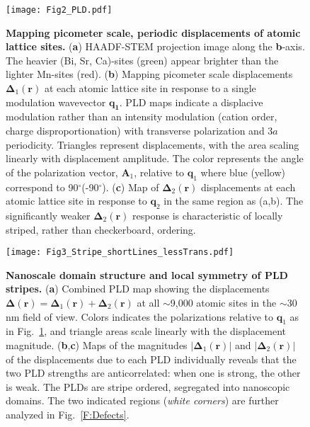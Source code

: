 \documentclass[12pt]{article}
\begin{document}
\begin{figure}
  \texttt{[image: Fig2\_PLD.pdf]}
  \caption{\textbf{Mapping picometer scale, periodic displacements of atomic lattice sites.} 
(\textbf{a}) HAADF-STEM projection image along the \textbf{b}-axis.  
The heavier (Bi, Sr, Ca)-sites (green) appear brighter than the lighter Mn-sites (red).
(\textbf{b}) Mapping picometer scale displacements $\mathbf{\Delta}_1(\mathbf{r})$ at each atomic lattice site in response to a single modulation wavevector $\mathbf{q_{1}}$. 
PLD maps indicate a displacive modulation rather than an intensity modulation (cation order, charge disproportionation) with transverse polarization and 3$a$ periodicity. 
Triangles represent displacements, with the area scaling linearly with displacement amplitude.
The color represents the angle of the polarization vector, $\mathbf{A}_1$, relative to $\mathbf{q}_1$ where blue (yellow) correspond to 90$^\circ$(-90$^\circ$). 
(\textbf{c}) Map of $\mathbf{\Delta}_2(\mathbf{r})$ displacements at each atomic lattice site in response to $\mathbf{q}_2$ in the same region as (a,b).  The significantly weaker $\mathbf{\Delta}_2(\mathbf{r})$ response is characteristic of locally striped, rather than checkerboard, ordering.}
  \label{F:PLD}
\end{figure}


\begin{figure}
  \begin{minipage}[b]{0.65\textwidth}
    \texttt{[image: Fig3\_Stripe\_shortLines\_lessTrans.pdf]}
  \end{minipage}\hfill
  \begin{minipage}[b]{0.32\textwidth}
    \caption{\textbf{Nanoscale domain structure and local symmetry of PLD stripes.}  
(\textbf{a}) Combined PLD map showing the displacements $\mathbf{\Delta}(\mathbf{r}) = \mathbf{\Delta}_1(\mathbf{r})+\mathbf{\Delta}_2(\mathbf{r})$ at all $\sim$9,000 atomic sites in the $\sim$30 nm field of view.  
Colors indicates the polarizations relative to $\mathbf{q}_1$ as in Fig.~\ref{F:PLD}, and triangle areas scale linearly with the displacement magnitude.
(\textbf{b},\textbf{c}) Maps of the magnitudes $\lvert\mathbf{\Delta}_1(\mathbf{r})\rvert$ and $\lvert\mathbf{\Delta}_2(\mathbf{r})\rvert$ of the displacements due to each PLD individually reveals that the two PLD strengths are anticorrelated: when one is strong, the other is weak. 
The PLDs are stripe ordered, segregated into nanoscopic domains.
The two indicated regions (\textit{white corners}) are further analyzed in Fig.~\ref{F:Defects}.}
    \label{F:Domains}
  \end{minipage}
\end{figure}
\end{document}
